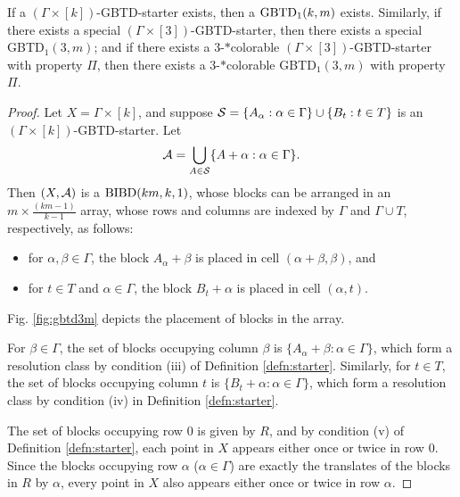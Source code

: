 \documentclass[draft, 11pt]{article}
\begin{document}
 \begin{proposition}\label{prop:starter-gbtd}
 If a $(\Gamma\times[k])$-GBTD-starter exists, 
 then a ${\rm GBTD}_1(k,m)$ exists.
 Similarly, if there exists a special $(\Gamma\times[3])$-GBTD-starter,
  then there exists a special GBTD$_1(3,m)$;
 and if there exists a $3$-$*$colorable $(\Gamma\times[3])$-GBTD-starter
 with property $\Pi$, then there exists a $3$-$*$colorable
 GBTD$_1(3,m)$ with property $\Pi$.
 \end{proposition}
 \begin{proof}
 Let $X=\Gamma\times[k]$, and suppose $\mathcal S=\{A_\alpha:
 \alpha\in\Gamma\} \cup \{B_t: t\in T\}$ is an
 $(\Gamma\times[k])$-GBTD-starter. Let
 \begin{equation*}
 \mathcal A = \bigcup_{A\in\mathcal S} \{ A+\alpha: \alpha\in\Gamma\}.
 \end{equation*}
 Then $(X,\mathcal A)$ is a ${\rm BIBD}(km,k,1)$, whose blocks can be
 arranged in an $m\times \frac{(km-1)}{k-1}$ array, whose rows and columns are
 indexed by $\Gamma$ and $\Gamma\cup T$, respectively, as follows:
 \begin{itemize} %
 \item for $\alpha,\beta\in\Gamma$, the block $A_\alpha+\beta$ is
 placed in cell $(\alpha+\beta,\beta)$, and
 \item for $t\in T$ and $\alpha\in\Gamma$, the block $B_t+\alpha$ is placed in cell $(\alpha,t)$.
 \end{itemize}
 Fig. \ref{fig:gbtd3m} depicts the placement of blocks in the array.

 For $\beta\in\Gamma$, the set of blocks occupying column $\beta$ is
 $\{A_\alpha+\beta: \alpha\in\Gamma\}$, which form a resolution class
 by condition (iii) of Definition \ref{defn:starter}. Similarly, for
 $t\in T$, the set of blocks occupying column $t$ is
 $\{B_t+\alpha:\alpha\in\Gamma\}$, which form a resolution class by
 condition (iv) in Definition \ref{defn:starter}.

 The set of blocks occupying row $0$ is given by $R$, and by
 condition (v) of Definition \ref{defn:starter}, each point in $X$
 appears either once or twice in row $0$. Since the blocks occupying
 row $\alpha$ ($\alpha\in\Gamma$) are exactly the translates of the
 blocks in $R$ by $\alpha$, every point in $X$ also appears either
 once or twice in row $\alpha$.
 

\end{proof}
\end{document}
